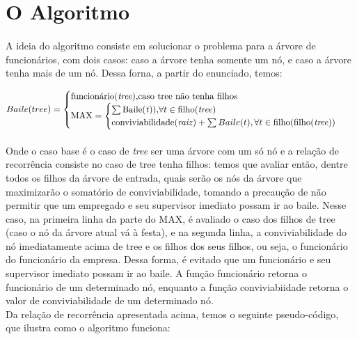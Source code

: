 \documentclass[a4paper]{article}
\begin{document}
\section{O Algoritmo}
\paragraph{} A ideia do algoritmo consiste em solucionar o problema para a árvore de funcionários, com dois casos: caso a árvore tenha somente um nó, e caso a árvore tenha mais de um nó. Dessa forna, a partir do enunciado, temos:


\begin{equation}
	Baile(tree) = \begin{cases}
		\text{funcionário(\textit{tree}),}  \text{caso tree não tenha filhos}\\
		\text{MAX} = \begin{cases}
			\sum \text{Baile(\textit{t})),}  \forall t \in \text{filho(\textit{tree})}\\
			\text{conviviabilidade(\textit{raiz})} + \sum  Baile(t), \forall t \in \text{filho(filho(\textit{tree}))}
			\end{cases}
		\end{cases}
\end{equation}
\paragraph{}Onde o caso base é o caso de \textit{tree} ser uma árvore com um só nó e a relação de recorrência consiste no caso de tree tenha filhos: temos que avaliar então, dentre todos os filhos da árvore de entrada, quais serão os nós da árvore que maximizarão o somatório de conviviabilidade, tomando a precaução de não permitir que um empregado e seu supervisor imediato possam ir ao baile. Nesse caso, na primeira linha da parte do MAX, é avaliado o caso dos filhos de tree (caso o nó da árvore atual vá à festa), e na segunda linha, a conviviabilidade do nó imediatamente acima de tree e os filhos dos seus filhos, ou seja, o funcionário do funcionário da empresa. Dessa forma, é evitado que um funcionário e seu supervisor imediato possam ir ao baile. A função funcionário retorna o funcionário de um determinado nó, enquanto a função conviviabiidade retorna o valor de conviviabilidade de um determinado nó.\\
Da relação de recorrência apresentada acima, temos o seguinte pseudo-código, que ilustra como o algoritmo funciona:
\end{document}
